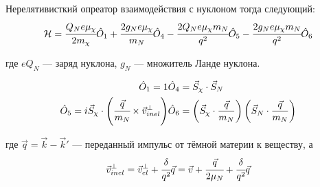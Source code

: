 Нерелятивисткий опреатор взаимодействия с нуклоном тогда следующий:
\begin{equation}
	\mathcal{H} = 
	\cfrac{Q_N e\mu_{\chi}}{2m_{\chi}} \hat{O}_1 + 
	\cfrac{2g_N e\mu_{\chi}}{m_{N}} \hat{O}_4-
	\cfrac{2Q_N e\mu_{\chi} m_{N} }{q^2} \hat{O}_5 -
	\cfrac{2g_N e\mu_{\chi} m_{N}}{q^2} \hat{O}_6
\end{equation}

где $e Q_N$ --- заряд нуклона,  $g_N$ --- множитель Ланде нуклона.


\begin{eqnarray}
	\hat{O}_1 = 1 & 
	\hat{O}_4 = \vec{S}_{\chi}\cdot\vec{S}_{N} \\
	\hat{O}_5 = i\vec{S}_{\chi}\cdot \left(\cfrac{\vec{q}}{m_N} \times \vec{v}^{\perp}_{inel} \right) & 
	\hat{O}_6 = \left(\vec{S}_{\chi} \cdot \frac{\vec{q}}{m_N}\right)\left(\vec{S}_N \cdot \frac{\vec{q}}{m_N}\right)
\end{eqnarray}

где $\vec{q} = \vec{k} - \vec{k}'$ --- переданный импульс от тёмной материи к веществу, а 
\begin{equation}
	\vec{v}^{\perp}_{inel} = \vec{v}^{\perp}_{el} + \cfrac{\delta}{q^2} \vec{q} = \vec{v}+\cfrac{\vec{q}}{2\mu_{N}} + \cfrac{\delta}{q^2} \vec{q}
\end{equation}
